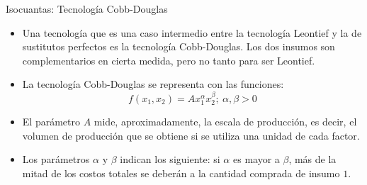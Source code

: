 \documentclass{beamer}
\theoremstyle{definition}
\begin{document}
\begin{frame}{Isocuantas: Tecnolog\'ia Cobb-Douglas}
\begin{itemize}
\item Una tecnología que es una caso intermedio entre la tecnología Leontief y la de sustitutos perfectos es la tecnología Cobb-Douglas. Los dos insumos son complementarios en cierta medida, pero no tanto para ser Leontief.
	\item La tecnología Cobb-Douglas se representa con las funciones:
		$$f(x_{1},x_{2})=Ax_{1}^{\alpha}x_{2}^{\beta}; \ \alpha,\beta > 0$$
	\item El parámetro $A$ mide, aproximadamente, la escala de producción, es decir, el volumen de producción
que se obtiene si se utiliza una unidad de cada factor. 

\item Los parámetros $\alpha$ y $\beta$ indican los siguiente: si $\alpha$ es mayor a $\beta$, más de la mitad de los costos totales se deberán a la cantidad comprada de insumo $1$.
\end{itemize}
\end{frame}

\end{document}
